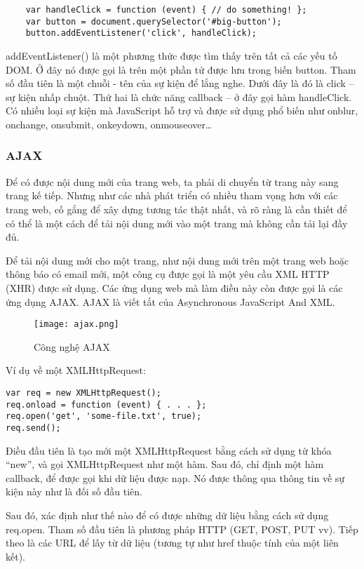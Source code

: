 \begin{lstlisting}
	var handleClick = function (event) { // do something! }; 
	var button = document.querySelector('#big-button'); 
	button.addEventListener('click', handleClick);
\end{lstlisting}


addEventListener() là một phương thức được tìm thấy trên tất cả các yếu tố DOM. Ở đây nó được gọi là trên một phần tử được lưu trong biến button. Tham số đầu tiên là một chuỗi - tên của sự kiện để lắng nghe. Dưới đây là đó là click – sự kiện nhấp chuột. Thứ hai là chức năng callback – ở đây gọi hàm handleClick.
Có nhiều loại sự kiện mà JavaScript hỗ trợ và được sử dụng phổ biến như onblur, onchange, onsubmit, onkeydown, onmouseover…

\subsubsection{AJAX}

Để có được nội dung mới của trang web, ta phải di chuyển từ trang này sang trang kế tiếp. Nhưng như các nhà phát triển có nhiều tham vọng hơn với các trang web, cố gắng để xây dựng tương tác thật nhất, và rõ ràng là cần thiết để có thể là một cách để tải nội dung mới vào một trang mà không cần tải lại đầy đủ.

Để tải nội dung mới cho một trang, như nội dung mới trên một trang web hoặc thông báo có email mới, một công cụ được gọi là một yêu cầu XML HTTP (XHR) được sử dụng. Các ứng dụng web mà làm điều này còn được gọi là các ứng dụng AJAX. AJAX là viết tắt của Asynchronous JavaScript And XML.

\begin{figure}[!htb] 
\centering
\texttt{[image: ajax.png]}
\caption{Công nghệ AJAX}
\end{figure}

Ví dụ về một XMLHttpRequest:

\begin{lstlisting}
var req = new XMLHttpRequest(); 
req.onload = function (event) { . . . }; 
req.open('get', 'some-file.txt', true); 
req.send(); 
\end{lstlisting}

Điều đầu tiên là tạo mới một XMLHttpRequest bằng cách sử dụng từ khóa “new”, và gọi XMLHttpRequest như một hàm.
Sau đó, chỉ định một hàm callback, để được gọi khi dữ liệu được nạp. Nó được thông qua thông tin về sự kiện này như là đối số đầu tiên.

Sau đó, xác định như thế nào để có được những dữ liệu bằng cách sử dụng req.open. Tham số đầu tiên là phương pháp HTTP (GET, POST, PUT vv). Tiếp theo là các URL để lấy từ dữ liệu (tương tự như href thuộc tính của một liên kết).

